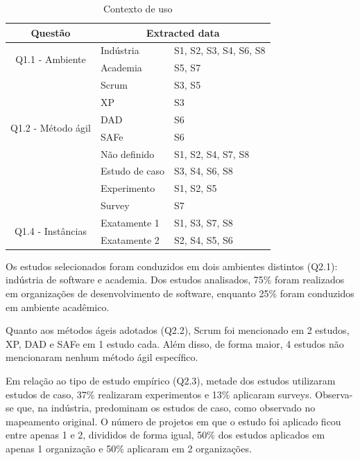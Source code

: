 \documentclass[
	12pt,
	openright,
	twoside,
	a4paper,
	english,
	brazil
	]{abntex2}
\begin{document}
\begin{table}[h!]
  \centering
  \caption{Contexto de uso}
  \begin{tabular}{|c|l|l|}
  \hline
  \textbf{Questão} & \multicolumn{2}{c|}{\textbf{Extracted data}} \\ \hline
  \multirow{2}{*}{Q1.1 - Ambiente} & Indústria & S1, S2, S3, S4, S6, S8 \\ \cline{2-3}
                                  & Academia  & S5, S7 \\ \hline
  \multirow{6}{*}{Q1.2 - Método ágil} & Scrum   & S3, S5 \\ \cline{2-3}
                                     & XP      & S3 \\ \cline{2-3}
                                     & DAD     & S6 \\ \cline{2-3}
                                     & SAFe    & S6 \\ \cline{2-3}
                                     & Não definido & S1, S2, S4, S7, S8 \\ \hline
  \multirow{3}{*}{Q1.3 - Tipo}        & Estudo de caso & S3, S4, S6, S8 \\ \cline{2-3}
                                     & Experimento    & S1, S2, S5 \\ \cline{2-3}
                                     & Survey         & S7 \\ \hline
  \multirow{2}{*}{Q1.4 - Instâncias}  & Exatamente 1   & S1, S3, S7, S8 \\ \cline{2-3}
                                     & Exatamente 2   & S2, S4, S5, S6 \\ \hline
  \end{tabular}
  \label{contexto}
  \end{table}

Os estudos selecionados foram conduzidos em dois ambientes distintos (Q2.1): indústria de software e academia. Dos estudos analisados, 75\% foram realizados em organizações de desenvolvimento de software, enquanto 25\% foram conduzidos em ambiente acadêmico.

Quanto aos métodos ágeis adotados (Q2.2), Scrum foi mencionado em 2 estudos, XP, DAD e SAFe em 1 estudo cada. Além disso, de forma maior, 4 estudos não mencionaram nenhum método ágil específico.

Em relação ao tipo de estudo empírico (Q2.3), metade dos estudos utilizaram estudos de caso, 37\% realizaram experimentos e 13\% aplicaram surveys. Observa-se que, na indústria, predominam os estudos de caso, como observado no mapeamento original.
O número de projetos em que o estudo foi aplicado ficou entre apenas 1 e 2, divididos de forma igual, 50\% dos estudos aplicados em apenas 1 organização e 50\% aplicaram em 2 organizações.
\end{document}
